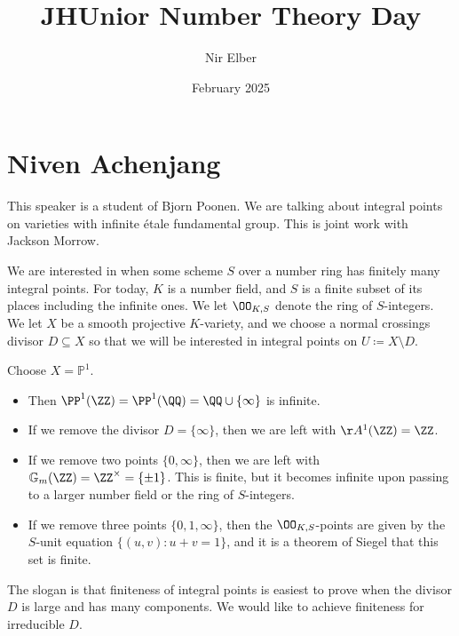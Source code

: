 \documentclass{article}
\title{JHUnior Number Theory Day}
\author{Nir Elber}
\date{February 2025}
\begin{document}
\maketitle

\tableofcontents

\section{Niven Achenjang}
This speaker is a student of Bjorn Poonen. We are talking about integral points on varieties with infinite \'etale fundamental group. This is joint work with Jackson Morrow.

We are interested in when some scheme $S$ over a number ring has finitely many integral points. For today, $K$ is a number field, and $S$ is a finite subset of its places including the infinite ones. We let $\OO_{K,S}$ denote the ring of $S$-integers. We let $X$ be a smooth projective $K$-variety, and we choose a normal crossings divisor $D\subseteq X$ so that we will be interested in integral points on $U\coloneqq X\setminus D$.
\begin{example}
	Choose $X=\mathbb P^1$.
	\begin{itemize}
		\item Then $\PP^1(\ZZ)=\PP^1(\QQ)=\QQ\cup\{\infty\}$ is infinite.
		\item If we remove the divisor $D=\{\infty\}$, then we are left with $\AA^1(\ZZ)=\ZZ$.
		\item If we remove two points $\{0,\infty\}$, then we are left with $\mathbb G_m(\ZZ)=\ZZ^\times=\{\pm1\}$. This is finite, but it becomes infinite upon passing to a larger number field or the ring of $S$-integers.
		\item If we remove three points $\{0,1,\infty\}$, then the $\OO_{K,S}$-points are given by the $S$-unit equation $\{(u,v):u+v=1\}$, and it is a theorem of Siegel that this set is finite.
	\end{itemize}
\end{example}
The slogan is that finiteness of integral points is easiest to prove when the divisor $D$ is large and has many components. We would like to achieve finiteness for irreducible $D$.
\end{document}
